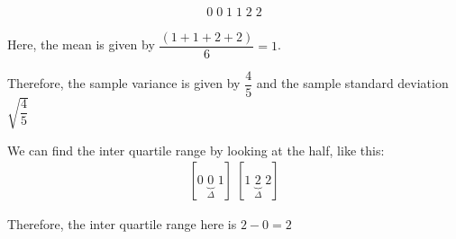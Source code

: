 \begin{equation*}
  \begin{gathered}
    0\;0\;1\;1\;2\;2
  \end{gathered}
\end{equation*}\par
\noindent Here, the mean is given by $\dfrac{(1+1+2+2)}{6} = 1$.\par
\noindent Therefore, the sample variance is given by $\dfrac{4}{5}$ and the sample standard deviation $\sqrt{\dfrac{4}{5}}$\par
\noindent We can find the inter quartile range by looking at the half, like this:
\begin{equation*}
  \begin{gathered}
    [0\;\underbrace{0}_{\text{$\Delta$}}\;1]\;[1\;\underbrace{2}_{\text{$\Delta$}}\;2]
  \end{gathered}
\end{equation*}\par
\noindent Therefore, the inter quartile range here is $2-0=2$
\par\bigskip
